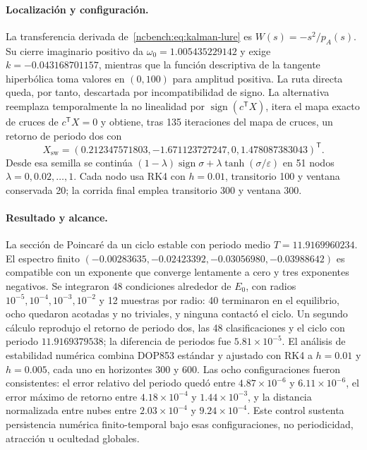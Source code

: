 \paragraph{Localización y configuración.}
La transferencia derivada de~\eqref{ncbench:eq:kalman-lure} es
\(W(s)=-s^2/p_A(s)\). Su cierre imaginario positivo da
\(\omega_0=1.005435229142\) y exige
\(k=-0.043168701157\), mientras que la función descriptiva de la tangente
hiperbólica toma valores en \((0,100)\) para amplitud positiva. La ruta directa
queda, por tanto, descartada por incompatibilidad de signo. La alternativa
reemplaza temporalmente la no linealidad por
\(\operatorname{sign}(c^{\mathsf T}X)\), itera el mapa exacto de cruces de
\(c^{\mathsf T}X=0\) y obtiene, tras 135 iteraciones del mapa de cruces, un
retorno de periodo dos con
\begin{equation}
 X_{\mathrm{sw}}=(0.212347571803,-1.671123727247,0,
 1.478087383043)^{\mathsf T}.
 \label{ncbench:eq:kalman-switching-seed}
\end{equation}
Desde esa semilla se continúa
\((1-\lambda)\operatorname{sign}\sigma+
\lambda\tanh(\sigma/\varepsilon)\) en 51 nodos
\(\lambda=0,0.02,\ldots,1\). Cada nodo usa RK4 con \(h=0.01\), transitorio
100 y ventana conservada 20; la corrida final emplea transitorio 300 y ventana
300.

\paragraph{Resultado y alcance.}
La sección de Poincaré da un ciclo estable con periodo medio
\(T=11.9169960234\). El espectro finito
\((-0.00283635,-0.02423392,-0.03056980,-0.03988642)\) es compatible con un
exponente que converge lentamente a cero y tres exponentes negativos. Se
integraron 48 condiciones alrededor de \(E_0\), con radios
\(10^{-5},10^{-4},10^{-3},10^{-2}\) y 12 muestras por radio: 40 terminaron
en el equilibrio, ocho quedaron acotadas y no triviales, y ninguna contactó
el ciclo. Un segundo cálculo reprodujo el retorno de periodo dos,
las 48 clasificaciones y el ciclo con periodo \(11.9169379538\); la diferencia
de periodos fue \(5.81\times10^{-5}\). El análisis de estabilidad
numérica combina DOP853 estándar y ajustado con RK4 a
\(h=0.01\) y \(h=0.005\), cada uno en horizontes 300 y 600. Las ocho
configuraciones fueron consistentes: el error relativo del periodo quedó entre
\(4.87\times10^{-6}\) y \(6.11\times10^{-6}\), el error máximo de retorno
entre \(4.18\times10^{-4}\) y \(1.44\times10^{-3}\), y la distancia
normalizada entre nubes entre \(2.03\times10^{-4}\) y
\(9.24\times10^{-4}\). Este control sustenta persistencia numérica
finito-temporal bajo esas configuraciones, no periodicidad, atracción u ocultedad
globales.


